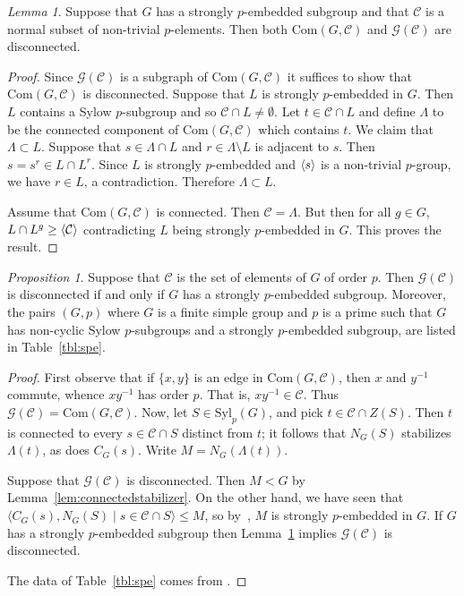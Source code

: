 \documentclass[11pt,a4paper]{amsart}
\theoremstyle{plain}
\theoremstyle{definition}
\theoremstyle{remark}
\newtheorem{lemma}[definition]{Lemma}
\newtheorem{proposition}[definition]{Proposition}
\newcounter{claim}[definition]
\theoremstyle{remark}
\theoremstyle{remark}
\theoremstyle{definition}
\newcommand{\GG}{\mathcal{G}}
\DeclarePairedDelimiter{\gen}{\langle}{\rangle}
\begin{document}
\begin{lemma}\label{lem:prophelp} Suppose that $G$ has a strongly $p$-embedded subgroup and that $\mathcal C$ is a normal subset of non-trivial $p$-elements. Then both $\mathrm{Com}(G,\mathcal C)$ and $\GG(\mathcal C)$ are disconnected.
\end{lemma}
\begin{proof} Since $\GG(\mathcal C)$ is a subgraph of $\mathrm{Com}(G,\mathcal C)$ it suffices to show that $\mathrm{Com}(G,\mathcal C)$ is disconnected. Suppose that $L$ is strongly $p$-embedded in $G$. Then $L$ contains a Sylow $p$-subgroup and so $\mathcal{C} \cap L\ne\emptyset$. Let $t \in \mathcal C \cap L$ and define $\Lambda$ to be the connected component of $\mathrm{Com}(G,\mathcal C)$ which contains $t$. We claim that $\Lambda \subset L$. Suppose that $s\in \Lambda \cap L$ and $r\in \Lambda\setminus L$ is adjacent to $s$. Then $s=s^r \in L \cap L^r$. Since $L$ is strongly $p$-embedded and $\gen{s}$ is a non-trivial $p$-group, we have $r \in L$, a contradiction. Therefore $\Lambda \subset L$.

Assume that $\mathrm{Com}(G,\mathcal C)$ is connected. Then $\mathcal C=\Lambda$. But then for all $g\in G$, $L\cap L^g \ge \gen{\mathcal C}$ contradicting $L$ being strongly $p$-embedded in $G$. This proves the result.
\end{proof}

\begin{proposition}\label{prop:spe} Suppose that $\mathcal C$ is the set of elements of $G$ of order $p$. Then $\GG(\mathcal C)$ is disconnected if and only if $G$ has a strongly $p$-embedded subgroup. Moreover, the pairs $(G,p)$ where $G$ is a finite simple group and $p$ is a prime such that $G$ has non-cyclic Sylow $p$-subgroups and a strongly $p$-embedded subgroup, are listed in Table~\ref{tbl:spe}.
\end{proposition}
\begin{proof} First observe that if $\{x,y\}$ is an edge in $\mathrm{Com}(G,\mathcal{C})$, then $x$ and $y^{-1}$ commute, whence $xy^{-1}$ has order $p$. That is, $xy^{-1}\in\mathcal{C}$. Thus $\GG(\mathcal C)=\mathrm{Com}(G,\mathcal{C})$. Now, let $S \in \mathrm{Syl}_p(G)$, and pick $t \in \mathcal C \cap Z(S)$. Then $t$ is connected to every $s\in \mathcal C \cap S$ distinct from $t$; it follows that $N_G(S)$ stabilizes $\Lambda (t)$, as does $C_G(s)$. Write $M=N_G(\Lambda(t))$.

Suppose that $\GG(\mathcal{C})$ is disconnected. Then $M<G$ by Lemma~\ref{lem:connectedstabilizer}. On the other hand, we have seen that $\langle C_G(s),N_G(S)\mid s \in \mathcal C \cap S\rangle\leq M$, so by~\cite[Proposition 17.11]{GLS2}, $M$ is strongly $p$-embedded in $G$. If $G$ has a strongly $p$-embedded subgroup then Lemma~\ref{lem:prophelp} implies $\GG(\mathcal C)$ is disconnected.

The data of Table~\ref{tbl:spe} comes from \cite[Theorem 7.6.1]{GLS3}.
\end{proof}
\end{document}
